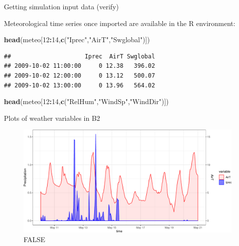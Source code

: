 \documentclass[ignorenonframetext,]{beamer}
\newenvironment{Shaded}{\begin{snugshade}}{\end{snugshade}}
\newcommand{\KeywordTok}[1]{\textcolor[rgb]{0.13,0.29,0.53}{\textbf{#1}}}
\newcommand{\DecValTok}[1]{\textcolor[rgb]{0.00,0.00,0.81}{#1}}
\newcommand{\StringTok}[1]{\textcolor[rgb]{0.31,0.60,0.02}{#1}}
\newcommand{\OperatorTok}[1]{\textcolor[rgb]{0.81,0.36,0.00}{\textbf{#1}}}
\newcommand{\NormalTok}[1]{#1}
\begin{document}
\begin{frame}[fragile]{Getting simulation input data (verify)}

Meteorological time series once imported are available in the R
environment:

\begin{Shaded}
\begin{Highlighting}[]
\KeywordTok{head}\NormalTok{(meteo[}\DecValTok{12}\OperatorTok{:}\DecValTok{14}\NormalTok{,}\KeywordTok{c}\NormalTok{(}\StringTok{"Iprec"}\NormalTok{,}\StringTok{"AirT"}\NormalTok{,}\StringTok{"Swglobal"}\NormalTok{)])}
\end{Highlighting}
\end{Shaded}

\begin{verbatim}
##                     Iprec  AirT Swglobal
## 2009-10-02 11:00:00     0 12.38   396.02
## 2009-10-02 12:00:00     0 13.12   500.07
## 2009-10-02 13:00:00     0 13.96   564.02
\end{verbatim}

\begin{Shaded}
\begin{Highlighting}[]
\KeywordTok{head}\NormalTok{(meteo[}\DecValTok{12}\OperatorTok{:}\DecValTok{14}\NormalTok{,}\KeywordTok{c}\NormalTok{(}\StringTok{"RelHum"}\NormalTok{,}\StringTok{"WindSp"}\NormalTok{,}\StringTok{"WindDir"}\NormalTok{)])}
\end{Highlighting}
\end{Shaded}

\end{frame}

\begin{frame}{Plots of weather variables in B2}

\begin{figure}
\centering
\includegraphics{presentation_files/figure-beamer/unnamed-chunk-6-1.pdf}
\caption{FALSE}
\end{figure}

\end{frame}
\end{document}
